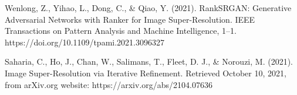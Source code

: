﻿\documentclass[10pt,a4paper,twocolumn,twoside]{article}
\begin{document}
\begin{thebibliography}{15}
Wenlong, Z., Yihao, L., Dong, C., \& Qiao, Y. (2021). RankSRGAN: Generative Adversarial Networks with Ranker for Image Super-Resolution. IEEE Transactions on Pattern Analysis and Machine Intelligence, 1–1. https://doi.org/10.1109/tpami.2021.3096327

Saharia, C., Ho, J., Chan, W., Salimans, T., Fleet, D. J., \& Norouzi, M. (2021). Image Super-Resolution via Iterative Refinement. Retrieved October 10, 2021, from arXiv.org website: https://arxiv.org/abs/2104.07636

‌
‌
\end{thebibliography}

\end{document}
